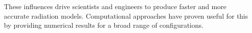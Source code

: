 These influences drive scientists and engineers to produce faster and more accurate radiation models.
Computational approaches have proven useful for this by providing numerical results for a broad range of configurations.












